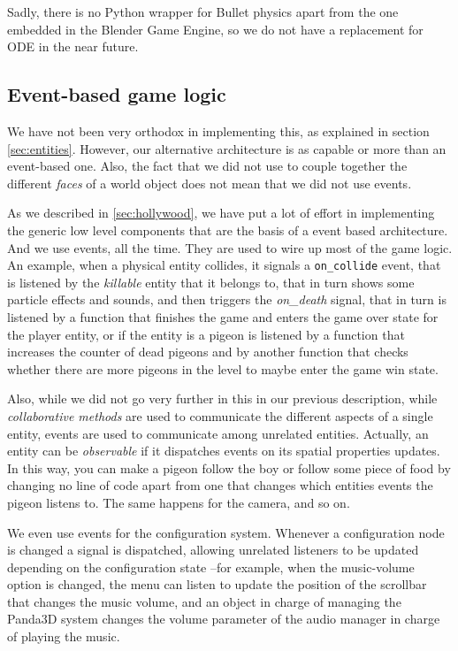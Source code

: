 \documentclass[a4paper,10pt]{article}
\begin{document}
Sadly, there is no Python wrapper for Bullet physics\cite{bullet}
apart from the one embedded in the Blender Game Engine, so we do not
have a replacement for ODE in the near future.

\subsection{Event-based game logic}

We have not been very orthodox in implementing this, as explained in
section \ref{sec:entities}. However, our alternative architecture is
as capable or more than an event-based one. Also, the fact that we
did not use to couple together the different \emph{faces} of a world
object does not mean that we did not use events.

As we described in \ref{sec:hollywood}, we have put a lot of effort in
implementing the generic low level components that are the basis of a
event based architecture. And we use events, all the time. They are
used to wire up most of the game logic. An example, when a physical
entity collides, it signals a \texttt{on\_collide} event, that is
listened by the \emph{killable} entity that it belongs to, that in
turn shows some particle effects and sounds, and then triggers the
\emph{on\_death} signal, that in turn is listened by a function that
finishes the game and enters the game over state for the player
entity, or if the entity is a pigeon is listened by a function that
increases the counter of dead pigeons and by another function that
checks whether there are more pigeons in the level to maybe enter the
game win state.

Also, while we did not go very further in this in our previous
description, while \emph{collaborative methods} are used to
communicate the different aspects of a single entity, events are used
to communicate among unrelated entities. Actually, an entity can be
\emph{observable} if it dispatches events on its spatial properties
updates. In this way, you can make a pigeon follow the boy or follow
some piece of food by changing no line of code apart from one that
changes which entities events the pigeon listens to. The same happens
for the camera, and so on.

We even use events for the configuration system. Whenever a
configuration node is changed a signal is dispatched, allowing
unrelated listeners to be updated depending on the configuration state
--for example, when the music-volume option is changed, the menu can
listen to update the position of the scrollbar that changes the music
volume, and an object in charge of managing the Panda3D system changes
the volume parameter of the audio manager in charge of playing the
music.
\end{document}
